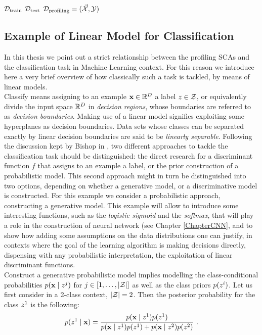 $\mathcal{D}_{\text{train}}$  $\mathcal{D}_{\text{test}}$ $\mathcal{D}_{\text{profiling}}=(\vec{\mathcal{X}},{\mathcal{Y}})$
\subsection{Example of Linear Model for Classification}\label{example:LDA}
In this thesis we point out a strict relationship between the profiling SCAs and the classification task in Machine Learning context. For this reason we introduce here a very brief overview of how classically such a task is tackled, by means of linear models. \\
Classify means assigning to an example $\textbf{x}\in\mathbb{R}^D$ a label $z\in \mathcal{Z}$, or equivalently divide the input space $\mathbb{R}^D$ in \emph{decision regions}, whose boundaries are referred to as \emph{decision boundaries}. Making use of a linear model signifies exploiting some hyperplanes as decision boundaries. Data sets whose classes can be separated exactly by linear decision boundaries are said to be \emph{linearly separable}. Following the discussion kept by Bishop in \cite{christopher2006pattern}, two different approaches to tackle the classification task should be distinguished: the direct research for a discriminant function $f$ that assigns to an example a label, or the prior construction of a probabilistic model. This second approach might in turn be distinguished into two options, depending on whether a generative model, or a discriminative model is constructed. For this example we consider a probabilistic approach, constructing a generative model. This example will allow to introduce some interesting functions, such as the \emph{logistic sigmoid} and the \emph{softmax}, that will play a role in the construction of neural network (see Chapter \ref{ChapterCNN}, and to show how adding some assumptions on the data distributions one can justify, in contexts where the goal of the learning algorithm is making decisions directly, dispensing with any probabilistic interpretation, the exploitation of linear discriminant functions. \\
Construct a generative probabilistic model implies modelling the class-conditional probabilities $p(\textbf{x}\mid z^j)$ for $j\in [1,\dots,\lvert\mathcal{Z}\rvert]$ as well as the class priors $p(z^i)$. Let us first consider in a 2-class context, \ie $\lvert\mathcal{Z}\rvert = 2$. Then the posterior probability for the class $z^1$ is the following:
\begin{equation}\label{eq:post_probs}
p(z^1\mid \textbf{x}) = \frac{p(\textbf{x}\mid z^1)p(z^1)}{p(\textbf{x}\mid z^1)p(z^1) + p(\textbf{x}\mid z^2)p(z^2)}\mbox{ .}
\end{equation}
